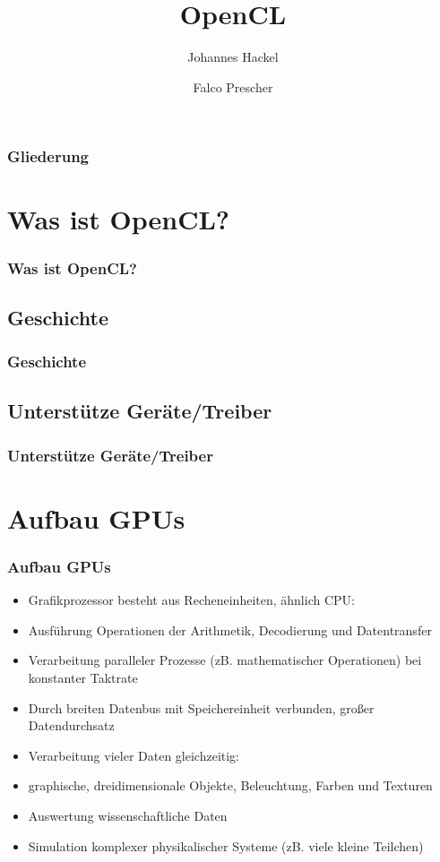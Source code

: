 \documentclass{beamer}
\author{Johannes Hackel \and Falco Prescher}
\title{OpenCL}
\begin{document}
\begin{frame}
\titlepage
\end{frame}

\begin{frame}
\frametitle{Gliederung}
\tableofcontents
\end{frame}

\section{Was ist OpenCL?}
\begin{frame}[fragile]
\frametitle{Was ist OpenCL?}
\end{frame}
\subsection{Geschichte}
\begin{frame}[fragile]
\frametitle{Geschichte}
\end{frame}
\subsection{Unterstütze Geräte/Treiber}
\begin{frame}[fragile]
\frametitle{Unterstütze Geräte/Treiber}
\end{frame}

\section{Aufbau GPUs}
\begin{frame}[fragile]
\frametitle{Aufbau GPUs}
\begin{itemize}
\item Grafikprozessor besteht aus Recheneinheiten, ähnlich CPU:
\item Ausführung Operationen der Arithmetik, Decodierung und Datentransfer
\item Verarbeitung paralleler Prozesse (zB. mathematischer Operationen) bei konstanter Taktrate
\item Durch breiten Datenbus mit Speichereinheit verbunden, großer Datendurchsatz
\item Verarbeitung vieler Daten gleichzeitig:
\item graphische, dreidimensionale Objekte, Beleuchtung, Farben und Texturen
\item Auswertung wissenschaftliche Daten
\item Simulation komplexer physikalischer Systeme (zB. viele kleine Teilchen)
\end{itemize}
\end{frame}
\end{document}
